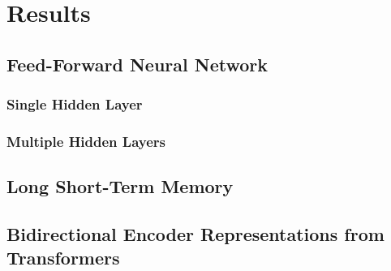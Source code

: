 \section{Results}
\label{sec:results}

\subsection{Feed-Forward Neural Network}

\subsubsection{Single Hidden Layer}

\subsubsection{Multiple Hidden Layers}

\subsection{Long Short-Term Memory}

\subsection{Bidirectional Encoder Representations from Transformers}